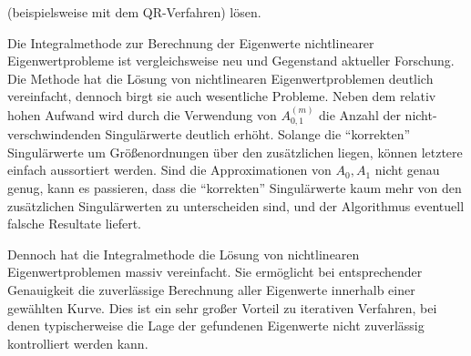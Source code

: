 (beispielsweise mit dem QR-Verfahren) lösen.

Die Integralmethode zur Berechnung der Eigenwerte nichtlinearer Eigenwertprobleme ist vergleichsweise neu und Gegenstand aktueller Forschung.
Die Methode hat die Lösung von nichtlinearen Eigenwertproblemen deutlich vereinfacht, dennoch birgt sie auch wesentliche Probleme.
Neben dem relativ hohen Aufwand wird durch die Verwendung von $A_{0, 1}^{(m)}$ die Anzahl der nicht-verschwindenden Singulärwerte deutlich erhöht.
Solange die \enquote{korrekten} Singulärwerte um Größenordnungen über den zusätzlichen liegen, können letztere einfach aussortiert werden.
Sind die Approximationen von $A_0, A_1$ nicht genau genug, kann es passieren, dass die \enquote{korrekten} Singulärwerte kaum mehr von den zusätzlichen Singulärwerten zu unterscheiden sind, und der Algorithmus eventuell falsche Resultate liefert.

Dennoch hat die Integralmethode die Lösung von nichtlinearen Eigenwertproblemen massiv vereinfacht.
Sie ermöglicht bei entsprechender Genauigkeit die zuverlässige Berechnung aller Eigenwerte innerhalb einer gewählten Kurve.
Dies ist ein sehr großer Vorteil zu iterativen Verfahren, bei denen typischerweise die Lage der gefundenen Eigenwerte nicht zuverlässig kontrolliert werden kann.
